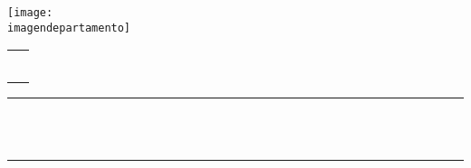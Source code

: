 {{{{{{{{		%
		\begin{center}
			\vspace*{-1.5cm}
			\texttt{[image: \\imagendepartamento]}
			\hspace*{-0.15cm}
			\begin{tabular}{l}
				\vspace*{0.26cm}\mbox{} ~ \\
				\COREwriteheaderitemsc{\nombreuniversidad}
				\COREwriteheaderitemsc{\nombrefacultad}
				\COREwriteheaderitemsc{\departamentouniversidad}
				\vspace*{1.25cm}\mbox{}
			\end{tabular}
		\end{center}

		\vfill
		\begin{center}
			\noindent \rule{\textwidth}{0.4mm} \\ \vspace{0.3cm}
			{\huge \textcolor{\portraittitlecolor}{\titulodelinforme} \vspace{0.2cm} ~ \\}
			\noindent \rule{\textwidth}{0.4mm} ~ \\ \vspace{0.40cm}
			{\large \textcolor{\portraittitlecolor}{\temaatratar} ~ \\}
		\end{center}

		\vfill
		\noindent
		\begin{minipage}{1.0\textwidth}
			\begin{flushright}
				\scshape{\tablaintegrantes}
			\end{flushright}
		\end{minipage}
	}{
	}}}}}}}}
